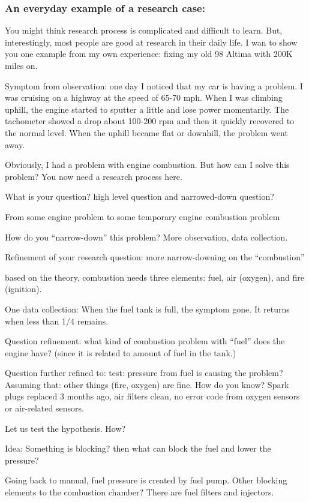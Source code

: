 \documentclass[11pt]{article}
\begin{document}
\subsubsection{An everyday example of a research case:}
You might think research process is complicated and difficult to learn.
But, interestingly, most people are good at research in their daily life.
I wan to show you one example from my own experience: fixing my old 98
Altima with 200K miles on.

Symptom from observation: one day I noticed that my car is having a problem. I
was cruising on a highway at the speed of 65-70 mph. When I was climbing
uphill, the engine started to sputter a little and lose power momentarily. The
tachometer showed a drop about 100-200 rpm and then it quickly recovered to
the normal level. When the uphill became flat or downhill, the problem went
away.

Obviously, I had a problem with engine combustion. But how can I solve this
problem? You now need a research process here.

What is your question? high level question and narrowed-down question?

From some engine problem to some temporary engine combustion problem 

How do you ``narrow-down'' this problem? More observation, data collection.

Refinement of your research question: more narrow-downing on the
``combustion''

based on the theory, combustion needs three elements: fuel, air (oxygen), and
fire (ignition).

One data collection: When the fuel tank is full, the symptom gone. It returns
when less than 1/4 remains.

Question refinement: what kind of combustion problem with ``fuel'' does the
engine have? (since it is related to amount of fuel in the tank.)

Question further refined to: test: pressure from fuel is causing the problem?
Assuming that: other things (fire, oxygen) are fine. How do you know? Spark
plugs replaced 3 months ago, air filters clean, no error code from oxygen
sensors or air-related sensors.

Let us test the hypothesis. How?

Idea: Something is blocking? then what can block the fuel and lower the
pressure? 

Going back to manual, fuel pressure is created by fuel pump. Other blocking
elements to the combustion chamber? There are fuel filters and injectors.
\end{document}
